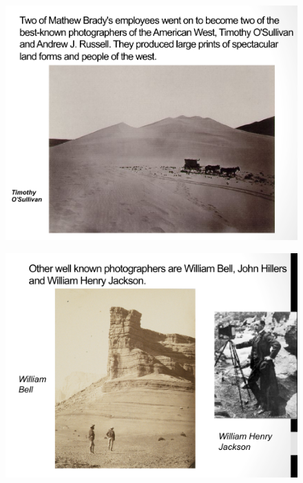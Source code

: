 \documentclass{beamer}
\begin{document}
\begin{frame}
	\begin{figure}
		\centering
		\includegraphics[scale=0.4]{93.jpg}
	\end{figure}
\end{frame}

\begin{frame}
	\begin{figure}
		\centering
		\includegraphics[scale=0.4]{94.jpg}
	\end{figure}
\end{frame}
\end{document}
